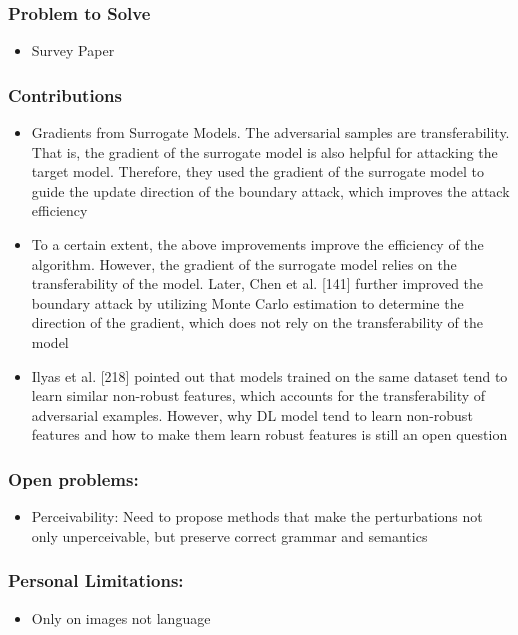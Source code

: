 \documentclass{article}
\begin{document}
\begin{flushleft}
\subsubsection*{Problem to Solve}
\begin{itemize}
    \item Survey Paper
\end{itemize}

\subsubsection*{Contributions}
\begin{itemize}
 \item Gradients from Surrogate Models. The adversarial samples are transferability. That is, the gradient of
the surrogate model is also helpful for attacking the target model. Therefore, they used the gradient of the
surrogate model to guide the update direction of the boundary attack, which improves the attack efficiency

\item To a certain extent, the above improvements improve the efficiency of the algorithm. However, the gradient of the surrogate model relies on the transferability of the model. Later, Chen et al. [141] further improved the boundary attack by
utilizing Monte Carlo estimation to determine the direction of the gradient, which does not rely on the transferability of the model

\item Ilyas et al. [218] pointed out that models trained on the same dataset tend to learn similar non-robust features, which accounts for the transferability of adversarial examples. However, why DL model tend to learn non-robust features and how to make them learn robust
features is still an open question 

\end{itemize}

\subsubsection*{Open problems:}
\begin{itemize}
  \item Perceivability: Need to propose methods that make the perturbations not only unperceivable, but preserve correct grammar and semantics
\end{itemize}

\subsubsection*{Personal Limitations:}
\begin{itemize}
  \item Only on images not language
\end{itemize}



\end{flushleft}
\end{document}
